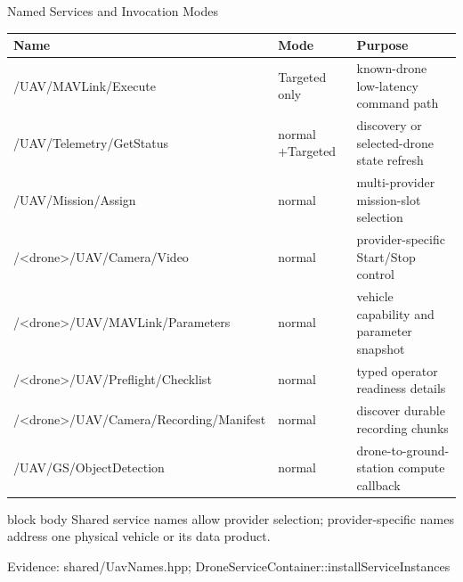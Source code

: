 \documentclass[aspectratio=169]{beamer}
\newcommand{\bluebox}[1]{%
  \begin{beamercolorbox}[rounded=true,shadow=false,sep=0.65em,wd=0.94\linewidth]{block body}
  #1
  \end{beamercolorbox}
}
\newcommand{\evidence}[1]{%
  \vfill\par\noindent
  \begin{minipage}{\linewidth}
  \raggedright{\color{SoftGray}\tiny Evidence: #1}\par
  \end{minipage}
}
\begin{document}
\begin{frame}{Named Services and Invocation Modes}
\scriptsize
\renewcommand{\arraystretch}{1.12}
\begin{tabularx}{\textwidth}{>{\ttfamily}p{4.6cm} p{2.7cm} Y}
\toprule
\textbf{Name} & \textbf{Mode} & \textbf{Purpose} \\
\midrule
/UAV/MAVLink/Execute & Targeted only & known-drone low-latency command path \\
/UAV/Telemetry/GetStatus & normal +\newline Targeted & discovery or selected-drone state refresh \\
/UAV/Mission/Assign & normal & multi-provider mission-slot selection \\
/<drone>/UAV/Camera/Video & normal & provider-specific Start/Stop control \\
/<drone>/UAV/MAVLink/\newline Parameters & normal & vehicle capability and parameter snapshot \\
/<drone>/UAV/Preflight/\newline Checklist & normal & typed operator readiness details \\
/<drone>/UAV/Camera/\newline Recording/Manifest & normal & discover durable recording chunks \\
/UAV/GS/ObjectDetection & normal & drone-to-ground-station compute callback \\
\bottomrule
\end{tabularx}

\vspace{0.35em}
\bluebox{Shared service names allow provider selection; provider-specific names address one physical vehicle or its data product.}
\evidence{shared/UavNames.hpp; DroneServiceContainer::installServiceInstances}
\end{frame}
\end{document}
